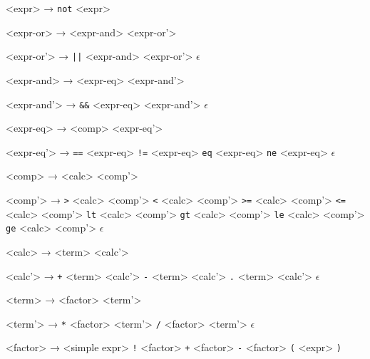 <expr>           → \texttt{not} <expr>

<expr-or>        → <expr-and> <expr-or'>

<expr-or'>       → \texttt{||} <expr-and> <expr-or'>
                 \alt $\epsilon$

<expr-and>       → <expr-eq> <expr-and'>

<expr-and'>      → \texttt{&&} <expr-eq> <expr-and'>
                 \alt $\epsilon$

<expr-eq>        → <comp> <expr-eq'>

<expr-eq'>       → \texttt{==} <expr-eq>
                 \alt \texttt{!=} <expr-eq>
                 \alt \texttt{eq} <expr-eq>
                 \alt \texttt{ne} <expr-eq>
                 \alt  $\epsilon$

<comp>           → <calc> <comp'>

<comp'>          → \texttt{>} <calc> <comp'>
                 \alt \texttt{<} <calc> <comp'>
                 \alt \texttt{>=} <calc> <comp'>
                 \alt \texttt{<=} <calc> <comp'>
                 \alt \texttt{lt} <calc> <comp'>
                 \alt \texttt{gt} <calc> <comp'>
                 \alt \texttt{le} <calc> <comp'>
                 \alt \texttt{ge} <calc> <comp'>
                 \alt $\epsilon$

<calc>           → <term> <calc'>

<calc'>          → \texttt{+} <term> <calc'>
                 \alt \texttt{-} <term> <calc'>
                 \alt \texttt{.} <term> <calc'>
                 \alt $\epsilon$
                 
<term>           → <factor> <term'>

<term'>          → \texttt{*} <factor> <term'>
                 \alt \texttt{/} <factor> <term'>
                 \alt $\epsilon$

<factor>         → <simple expr>
                 \alt \texttt{!} <factor>
                 \alt \texttt{+} <factor>
                 \alt \texttt{-} <factor>
                 \alt \texttt{(} <expr> \texttt{)}
